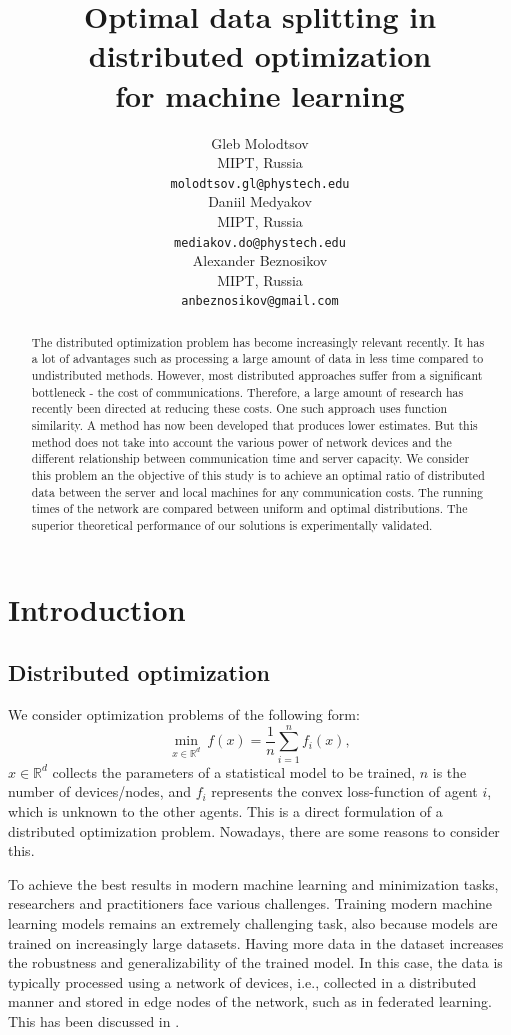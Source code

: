 \documentclass{article}
\title{Optimal data splitting in distributed optimization \\for machine learning}
\author{Gleb Molodtsov
    \\
	MIPT, Russia\\
	\texttt{molodtsov.gl@phystech.edu} \\
	\And
	Daniil Medyakov \\
	MIPT, Russia\\
	\texttt{mediakov.do@phystech.edu} \\
 \And
	Alexander Beznosikov \\
	MIPT, Russia\\
	\texttt{anbeznosikov@gmail.com} \\
}
\date{}
\begin{document}
\maketitle

\begin{abstract}
The distributed optimization problem has become increasingly relevant recently. It has a lot of advantages such as processing a large amount of data in less time compared to undistributed methods. However, most distributed approaches suffer from a significant bottleneck - the cost of communications. Therefore, a large amount of research has recently been directed at reducing these costs. One such approach uses function similarity. A method has now been developed that produces lower estimates. But this method does not take into account the various power of network devices and the different relationship between communication time and server capacity. We consider this problem an the objective of this study is to achieve an optimal ratio of distributed data between the server and local machines for any communication costs. The running times of the network are compared between uniform and optimal distributions. The superior theoretical performance of our solutions is experimentally validated.
\end{abstract}




\section{Introduction}

\subsection{Distributed optimization}
We consider optimization problems of the following form:
\begin{equation}
    \label{eq:1}
    \underset{x\in \mathbb{R}^d}{\min} ~ f(x) = \frac{1}{n} \sum \limits_{i = 1}^{n} f _i(x),
\end{equation}
$x\in\mathbb{R}^d$ collects the parameters of a statistical model to be trained, $n$ is the number of devices/nodes, and $f_i$ represents the convex loss-function of agent $i$, which is unknown to the other agents. This is a direct formulation of a distributed optimization problem. Nowadays, there are some reasons to consider this.

To achieve the best results in modern machine learning and minimization tasks, researchers and practitioners face various challenges. Training modern machine learning models remains an extremely challenging task, also because models are trained on increasingly large datasets. Having more data in the dataset increases the robustness and generalizability of the trained model. In this case, the data is typically processed using a network of devices, i.e., collected in a distributed manner and stored in edge nodes of the network, such as in federated learning. This has been discussed in \cite{verbraeken2020survey}.
\end{document}
